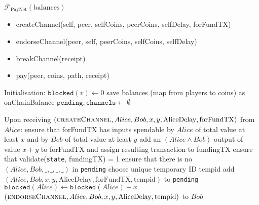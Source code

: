 \begin{functionality}{$\mathcal{F}_{\mathrm{PayNet}}
\left(\mathrm{balances}\right)$}
  \label{alg:payfunc}
    \begin{itemize}
      \item createChannel(self, peer, selfCoins, peerCoins, selfDelay, forFundTX)
      \item endorseChannel(peer, self, peerCoins, selfCoins, selfDelay)
      \item breakChannel(receipt)
      \item pay(peer, coins, path, receipt)
    \end{itemize}

  \begin{algorithmic}[1]
    \State Initialisation:
      \Indent
        \State $\mathtt{blocked}\left(v\right) \gets 0$
      \EndFor
      \State save balances (map from players to coins) as onChainBalance
      \State $\mathtt{pending}, \mathtt{channels} \gets \emptyset$
      \EndIndent
    \State

    \State Upon receiving $\left(\textsc{createChannel}, Alice, Bob, x, y,
    \mathrm{AliceDelay}, \mathrm{forFundTX}\right)$ from $Alice$:
    \Indent
      \State ensure that forFundTX has inputs spendable by $Alice$ of total
      value at least $x$ and by $Bob$ of total value at least $y$
      \State add an $\left(Alice \wedge Bob\right)$ output of value $x + y$ to
      forFundTX and assign resulting transaction to fundingTX
      \State ensure that validate(\texttt{state}, fundingTX) = 1
      \State ensure that there is no $\left(Alice, Bob, \_, \_, \_, \_\right)$
      in \texttt{pending}
      \State choose unique temporary ID tempid
      \State add $\left(Alice, Bob, x, y, \mathrm{AliceDelay},
      \mathrm{forFundTX}, \mathrm{tempid}\right)$ to \texttt{pending}
      \State $\mathtt{blocked}\left(Alice\right) \leftarrow
      \mathtt{blocked}\left(Alice\right) + x$
      \State \Return $\left(\textsc{endorseChannel}, Alice, Bob, x, y,
      \mathrm{AliceDelay}, \mathrm{tempid}\right)$ to $Bob$ 
    \EndIndent
    \State


\end{algorithmic}
\end{functionality}
